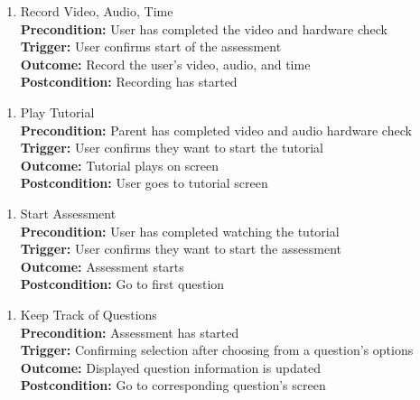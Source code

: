 \documentclass[12pt]{article}
\begin{document}
\begin{enumerate}[{PUC-}13. ]
  \item Record Video, Audio, Time\\
  \textbf{Precondition: }User has completed the video and hardware check\\
  \textbf{Trigger: }User confirms start of the assessment\\
  \textbf{Outcome: }Record the user's video, audio, and time\\
  \textbf{Postcondition: }Recording has started\\
\end{enumerate}

\begin{enumerate}[{PUC-}14. ]
  \item Play Tutorial\\
  \textbf{Precondition: }Parent has completed video and audio hardware check\\
  \textbf{Trigger: }User confirms they want to start the tutorial\\
  \textbf{Outcome: }Tutorial plays on screen\\
  \textbf{Postcondition: }User goes to tutorial screen\\
\end{enumerate}

\begin{enumerate}[{PUC-}15. ]
  \item Start Assessment\\
  \textbf{Precondition: }User has completed watching the tutorial\\
  \textbf{Trigger: }User confirms they want to start the assessment\\
  \textbf{Outcome: }Assessment starts\\
  \textbf{Postcondition: }Go to first question\\
\end{enumerate}

\begin{enumerate}[{PUC-}16. ]
  \item Keep Track of Questions\\
  \textbf{Precondition: }Assessment has started\\
  \textbf{Trigger: }Confirming selection after choosing from a question's options\\
  \textbf{Outcome: }Displayed question information is updated\\
  \textbf{Postcondition: }Go to corresponding question's screen\\
\end{enumerate}
\end{document}
